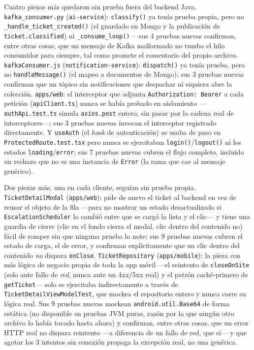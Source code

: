 Cuatro piezas más quedaron sin prueba fuera del backend Java. \texttt{kafka\_consumer.py}
(\texttt{ai-service}): \texttt{classify()} ya tenía prueba propia, pero no
\texttt{\_handle\_ticket\_created()} (el guardado en Mongo y la publicación de
\texttt{ticket.classified}) ni \texttt{\_consume\_loop()} —sus 4 pruebas nuevas confirman,
entre otras cosas, que un mensaje de Kafka malformado no tumba el hilo consumidor para siempre,
tal como promete el comentario del propio archivo. \texttt{kafkaConsumer.js}
(\texttt{notification-service}): \texttt{dispatch()} ya tenía prueba, pero no
\texttt{handleMessage()} (el mapeo a documentos de Mongo); sus 3 pruebas nuevas confirman que un
tópico sin notificaciones que despachar ni siquiera abre la colección. \texttt{apps/web}: el
interceptor que adjunta \texttt{Authorization: Bearer} a cada petición (\texttt{apiClient.ts})
nunca se había probado en aislamiento —\texttt{authApi.test.ts} simula \texttt{axios.post}
entero, sin pasar por la cadena real de interceptores—; sus 3 pruebas nuevas invocan el
interceptor registrado directamente. Y \texttt{useAuth} (el \emph{hook} de autenticación) se
usaba de paso en \texttt{ProtectedRoute.test.tsx} pero nunca se ejercitaban
\texttt{login()}/\texttt{logout()} ni los estados \texttt{loading}/\texttt{error}; sus 7 pruebas
nuevas cubren el flujo completo, incluido un rechazo que no es una instancia de \texttt{Error}
(la rama que cae al mensaje genérico).

Dos piezas más, una en cada cliente, seguían sin prueba propia. \texttt{TicketDetailModal}
(\texttt{apps/web}): pide de nuevo el ticket al backend en vez de reusar el objeto de la fila
—para no mostrar un estado desactualizado si \texttt{EscalationScheduler} lo cambió entre que
se cargó la lista y el clic— y tiene una guardia de cierre (clic en el fondo cierra el modal,
clic dentro del contenido no) fácil de romper sin que ninguna prueba lo note; sus 9 pruebas
nuevas cubren el estado de carga, el de error, y confirman explícitamente que un clic dentro
del contenido \emph{no} dispara \texttt{onClose}. \texttt{TicketRepository}
(\texttt{apps/mobile}): la pieza con más lógica de negocio propia de toda la app móvil —el
reintento de \texttt{closeOnSite} (solo ante fallo de \emph{red}, nunca ante un 4xx/5xx real) y
el patrón caché-primero de \texttt{getTicket}— solo se ejercitaba indirectamente a través de
\texttt{TicketDetailViewModelTest}, que mockea el repositorio entero y nunca corre su lógica
real. Sus 9 pruebas nuevas mockean \texttt{android.util.Base64} de forma estática (no disponible
en pruebas JVM puras, razón por la que ningún otro archivo lo había tocado hasta ahora) y
confirman, entre otras cosas, que un error HTTP real no dispara reintento —a diferencia de un
fallo de red, que sí— y que agotar los 3 intentos sin conexión propaga la excepción real, no una
genérica.

